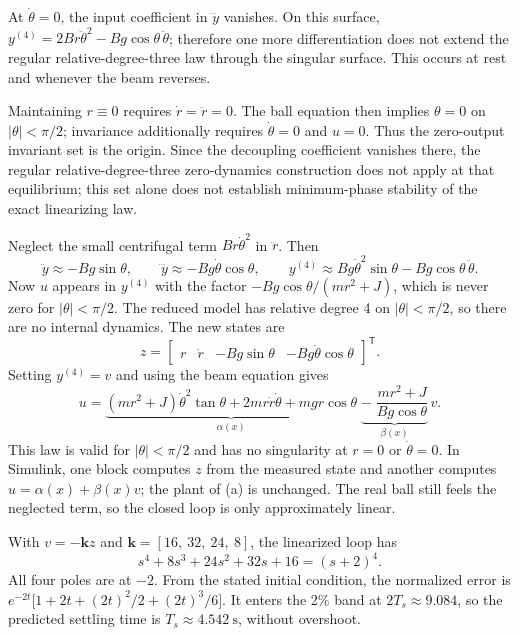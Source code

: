 At $\dot\theta=0$, the input coefficient in $\dddot y$ vanishes. On this surface,
$y^{(4)}=2Br\ddot\theta^2-Bg\cos\theta\,\ddot\theta$;
therefore one more differentiation does not extend the regular relative-degree-three law through the singular surface. This occurs at rest and whenever the beam reverses.

Maintaining $r\equiv0$ requires $\dot r=\ddot r=0$. The ball equation then implies $\theta=0$ on $|\theta|<\pi/2$; invariance additionally requires $\dot\theta=0$ and $u=0$. Thus the zero-output invariant set is the origin. Since the decoupling coefficient vanishes there, the regular relative-degree-three zero-dynamics construction does not apply at that equilibrium; this set alone does not establish minimum-phase stability of the exact linearizing law.

\clearpage
{}
Neglect the small centrifugal term $Br\dot\theta^2$ in $\ddot r$. Then
\begin{equation}
 \ddot y\approx-Bg\sin\theta,\qquad
 \dddot y\approx-Bg\dot\theta\cos\theta,\qquad
 y^{(4)}\approx Bg\dot\theta^2\sin\theta-Bg\cos\theta\,\ddot\theta .
\end{equation}
Now $u$ appears in $y^{(4)}$ with the factor $-Bg\cos\theta/(mr^2+J)$, which is never zero for $|\theta|<\pi/2$. The reduced model has relative degree 4 on $|\theta|<\pi/2$, so there are no internal dynamics. The new states are
\begin{equation}
 z=\begin{bmatrix}r&\dot r&-Bg\sin\theta&-Bg\dot\theta\cos\theta\end{bmatrix}^\mathsf{T}.
\end{equation}
Setting $y^{(4)}=v$ and using the beam equation gives
\begin{equation}
 \boxed{u=\underbrace{(mr^2+J)\dot\theta^2\tan\theta+2mr\dot r\dot\theta+mgr\cos\theta}_{\alpha(x)}\;\underbrace{-\;\frac{mr^2+J}{Bg\cos\theta}}_{\beta(x)}\,v.}
\end{equation}
This law is valid for $|\theta|<\pi/2$ and has no singularity at $r=0$ or $\dot\theta=0$. In Simulink, one block computes $z$ from the measured state and another computes $u=\alpha(x)+\beta(x)v$; the plant of (a) is unchanged. The real ball still feels the neglected term, so the closed loop is only approximately linear.

With $v=-\mathbf{k}z$ and $\mathbf{k}=[16,\ 32,\ 24,\ 8]$, the linearized loop has
\begin{equation}
 s^4+8s^3+24s^2+32s+16=(s+2)^4 .
\end{equation}
All four poles are at $-2$. From the stated initial condition, the normalized error is $e^{-2t}\bigl[1+2t+(2t)^2/2+(2t)^3/6\bigr]$. It enters the 2\% band at $2T_s\approx9.084$, so the predicted settling time is $\boxed{T_s\approx4.542\ \mathrm{s}}$, without overshoot.

